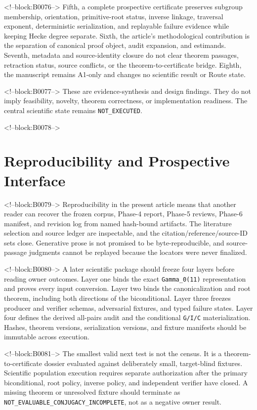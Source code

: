 \documentclass[11pt]{article}
\begin{document}
<!--block:B0076-->
Fifth, a complete prospective certificate preserves subgroup membership,
orientation, primitive-root status, inverse linkage, traversal exponent,
deterministic serialization, and replayable failure evidence while
keeping Hecke degree separate. Sixth, the article's methodological
contribution is the separation of canonical proof object, audit
expansion, and estimands. Seventh, metadata and source-identity closure
do not clear theorem passages, retraction status, source conflicts, or
the theorem-to-certificate bridge. Eighth, the manuscript remains A1-only
and changes no scientific result or Route state.

<!--block:B0077-->
These are evidence-synthesis and design findings. They do not imply
feasibility, novelty, theorem correctness, or implementation readiness.
The central scientific state remains \texttt{NOT\_EXECUTED}.

<!--block:B0078-->
\hypertarget{6-reproducibility-and-prospective-interface}{%
\section{Reproducibility and Prospective
Interface}\label{6-reproducibility-and-prospective-interface}}

<!--block:B0079-->
Reproducibility in the present article means that another reader can
recover the frozen corpus, Phase-4 report, Phase-5 reviews, Phase-6
manifest, and revision log from named hash-bound artifacts. The
literature selection and source ledger are inspectable, and the
citation/reference/source-ID sets close. Generative prose is not
promised to be byte-reproducible, and source-passage judgments cannot be
replayed because the locators were never finalized.

<!--block:B0080-->
A later scientific package should freeze four layers before reading
owner outcomes. Layer one binds the exact \texttt{Gamma\_0(11)}
representation and proves every input conversion. Layer two binds the
canonicalization and root theorem, including both directions of the
biconditional. Layer three freezes producer and verifier schemas,
adversarial fixtures, and typed failure states. Layer four defines the
derived all-pairs audit and the conditional \texttt{G/I/C}
materialization. Hashes, theorem versions, serialization versions, and
fixture manifests should be immutable across execution.

<!--block:B0081-->
The smallest valid next test is not the census. It is a
theorem-to-certificate dossier evaluated against deliberately small,
target-blind fixtures. Scientific population execution requires separate
authorization after the primary biconditional, root policy, inverse
policy, and independent verifier have closed. A missing theorem or
unresolved fixture should terminate as
\texttt{NOT\_EVALUABLE\_CONJUGACY\_INCOMPLETE}, not as a negative owner
result.
\end{document}
